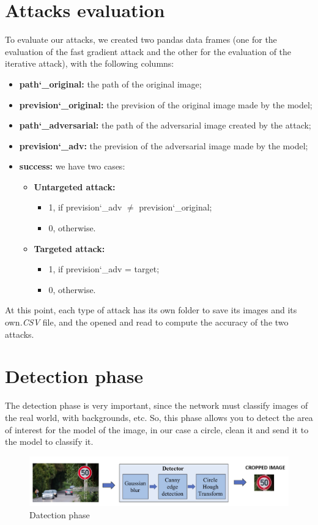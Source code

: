 \section{Attacks evaluation}
To evaluate our attacks, we created two pandas data frames (one for the evaluation of the fast gradient attack and the other for the evaluation of the iterative attack), with the following columns:
\begin{itemize}
	\item \textbf{path\char`_original:} the path of the original image;
	\item \textbf{prevision\char`_original:} the prevision of the original image made by the model;
	\item \textbf{path\char`_adversarial:} the path of the adversarial image created by the attack;
	\item \textbf{prevision\char`_adv:} the prevision of the adversarial image made by the model;
	\item \textbf{success:} we have two cases:
	\begin{itemize}
		\item \textbf{Untargeted attack:} 
		\begin{itemize}
			\item 1, if prevision\char`_adv $\neq$ prevision\char`_original;
			\item 0, otherwise.
		\end{itemize}
		\item \textbf{Targeted attack:}
		\begin{itemize}
			\item 1, if prevision\char`_adv = target;
			\item 0, otherwise.
		\end{itemize}
	\end{itemize}
\end{itemize}

At this point, each type of attack has its own folder to save its images and its own\textit{.CSV} file, and the opened and read to compute the accuracy of the two attacks.


\section{Detection phase}
The detection phase is very important, since the network must classify images of the real world, with backgrounds, etc. So, this phase allows you to detect the area of interest for the model of the image, in our case a circle, clean it and send it to the model to classify it.
\begin{figure}[!ht]
	\includegraphics[width=\linewidth]{img/6.PNG} %
	\caption{Datection phase} %
\end{figure}

